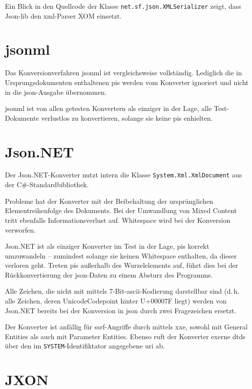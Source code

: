 Ein Blick in den Quellcode der Klasse \texttt{net.sf.json.XMLSerializer} zeigt, dass Json-lib den \acrshort{xml}-Parser XOM einsetzt.

\section{\acrshort{jsonml}}
\label{sec:jsonml}

Das Konversionverfahren \acrshort{jsonml} ist vergleichsweise vollständig. Lediglich die in Ursprungsdokumenten enthaltenen \glspl{pi} werden vom Konverter ignoriert und nicht in die \acrshort{json}-Ausgabe übernommen.

\acrshort{jsonml} ist von allen getesten Konvertern als einziger in der Lage, alle Test-Dokumente verlustlos zu konvertieren, solange sie keine \glspl{pi} enhielten.

\section{Json.NET}
\label{sec:jsondotnet}

Der Json.NET-Konverter nutzt intern die Klasse \texttt{System.Xml.XmlDocument} aus der C\#\hyp{}Standardbibliothek.

Probleme hat der Konverter mit der Beibehaltung der ursprünglichen Elementreihenfolge des Dokuments. Bei der Umwandlung von Mixed Content tritt ebenfalls Informationsverlust auf. Whitespace wird bei der Konversion verworfen.

Json.NET ist als einziger Konverter im Test in der Lage, \glspl{pi} korrekt umzuwandeln -- zumindest solange sie keinen Whitespace enthalten, da dieser verloren geht. Treten \glspl{pi} außerhalb des Wurzelelements auf, führt dies bei der Rückkonvertierung der \acrshort{json}-Daten zu einem Absturz des Programms.

Alle Zeichen, die nicht mit mittels 7-Bit-\acrshort{ascii}-Kodierung darstellbar sind (d.\,h. alle Zeichen, deren UnicodeCodepoint hinter U+00007F liegt) werden von Json.NET bereits bei der Konversion in \acrshort{json} durch zwei Fragezeichen ersetzt.

Der Konverter ist anfällig für \acrshort{ssrf}-Angriffe durch mittels \acrlong{xxe}, sowohl mit General Entities als auch mit Parameter Entities. Ebenso ruft der Konverter exerne \glspl{dtd} über den im \texttt{SYSTEM}-Identifiktator angegebene \acrshort{uri} ab.

\section{JXON}
\label{sec:jxon}

